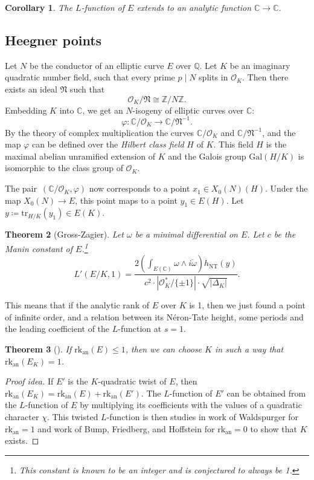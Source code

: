 \documentclass[12pt]{article}
\newtheorem{theorem}{Theorem}[section]
\newtheorem{corollary}[theorem]{Corollary}
\theoremstyle{definition}
\numberwithin{equation}{subsection}
\newcommand{\C}{\ensuremath{\mathbb{C}}}
\newcommand{\Q}{\ensuremath{\mathbb{Q}}}
\newcommand{\Z}{\ensuremath{\mathbb{Z}}}
\begin{document}
\begin{corollary}
The $L$-function of $E$ extends to an analytic function $\C \to \C$.
\end{corollary}

\subsection{Heegner points}

Let $N$ be the conductor of an elliptic curve $E$ over $\Q$.
Let $K$ be an imaginary quadratic number field, such that every prime $p \mid N$ splits in $\mathcal{O}_K$.
Then there exists an ideal $\mathfrak{N}$ such that $$\mathcal{O}_K / \mathfrak{N} \cong \Z/N\Z.$$
Embedding $K$ into $\C$, we get an $N$-isogeny of elliptic curves over $\C$:
$$\varphi \colon \C / \mathcal{O}_K \to \C / \mathfrak{N}^{-1}.$$
By the theory of complex multiplication the curves $\C / \mathcal{O}_K$ and $\C / \mathfrak{N}^{-1}$, and the map $\varphi$ can be defined over the {\em Hilbert class field} $H$ of $K$.
This field $H$ is the maximal abelian unramified extension of $K$ and the Galois group $\mathrm{Gal}(H/K)$ is isomorphic to the class group of $\mathcal{O}_K$.

The pair~$(\C/\mathcal{O}_K, \varphi)$ now corresponds to a point $x_1 \in X_0(N)(H)$.
Under the map $X_0(N) \to E$, this point maps to a point $y_1 \in E(H)$.
Let $y \coloneqq \mathrm{tr}_{H/K}(y_1) \in E(K)$.

\begin{theorem}[Gross-Zagier]
Let $\omega$ be a minimal differential on $E$.
Let $c$ be the Manin constant of $E$.\footnote{This constant is known to be an integer and is conjectured to always be 1.}
$$L'(E/K, 1) = \frac{2\left( \int_{E(\C)} \omega \wedge \overline{i \omega} \right) h_{\mathrm{NT}}(y)}{c^2 \cdot |\mathcal{O}_{K}^* / \{\pm 1 \}| \cdot \sqrt{|\Delta_K|}}.$$
\end{theorem}

This means that if the analytic rank of $E$ over $K$ is 1, then we just found a point of infinite order, and a relation between its N\'eron-Tate height, some periods and the leading coefficient of the $L$-function at $s = 1$.

\begin{theorem}[\textrm{\cite[Thm.~4.4]{proveBSD}}]
If $\mathrm{rk}_{\mathrm{an}}(E) \leq 1$, then we can choose $K$ in such a way that~$\mathrm{rk}_{\mathrm{an}}(E_K) = 1$.
\end{theorem}

\begin{proof}[Proof idea]
If $E'$ is the $K$-quadratic twist of $E$, then $\mathrm{rk}_{\mathrm{an}}(E_K) = \mathrm{rk}_{\mathrm{an}}(E) + \mathrm{rk}_{\mathrm{an}}(E')$.
The $L$-function of $E'$ can be obtained from the $L$-function of $E$ by multiplying its coefficients with the values of a quadratic character $\chi$.
This twisted $L$-function is then studies in work of Waldspurger for $\mathrm{rk}_{\mathrm{an}} = 1$ and work of Bump, Friedberg, and Hoffstein for $\mathrm{rk}_{\mathrm{an}} = 0$ to show that $K$ exists.
\end{proof}
\end{document}
